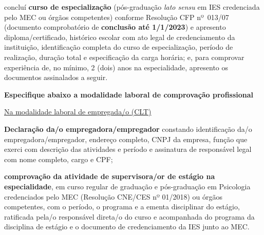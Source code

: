 \documentclass[openright, oneside, a4paper, article, brazil]{abntex2}
\newcommand{\caixasel}[1]{\raisebox{-6pt}{\fbox{\CheckBox[name=#1,bordercolor=black]{\null}}}}
\renewcommand{\subsection}{\centering\bfseries}
\begin{document}
    \begin{minipage}[t]{0.05\textwidth}
        \caixasel{esp3}
    \end{minipage}%
    \begin{minipage}[t]{0.95\textwidth}
	concluí \textbf{curso de especialização} (pós-graduação \textit{lato sensu} em IES credenciada pelo MEC ou órgãos competentes) conforme Resolução CFP nº~013/07 (documento comprobatório de \textbf{conclusão até 1/1/2023}) e apresento diploma/certificado, histórico escolar com ato legal de credenciamento da instituição, identificação completa do curso de especialização, período de realização, duração total e especificação da carga horária; e, para comprovar experiência de, no mínimo, 2 (dois) anos na especialidade, apresento os documentos assinalados a seguir.
\end{minipage}

\clearpage
\subsection{Especifique abaixo a modalidade laboral de comprovação profissional}
\vspace{\baselineskip}
\normalfont

\begin{minipage}{\textwidth}
    \centering
\underline{Na modalidade laboral de empregada/o (CLT)}
\end{minipage}
\vspace{0.5\baselineskip}

\normalfont
\begin{minipage}[t]{0.05\textwidth}
    \caixasel{clt1}
\end{minipage}%
\begin{minipage}[t]{0.95\textwidth}
	\textbf{Declaração da/o empregadora/empregador} constando identificação da/o empregadora/empregador, endereço completo, CNPJ da empresa, função que exerci com descrição das atividades e período e assinatura de responsável legal com nome completo, cargo e CPF;
\end{minipage}
    \vspace*{0.5\baselineskip}

\begin{minipage}[t]{0.05\textwidth}
    \caixasel{clt2}
\end{minipage}%
\begin{minipage}[t]{0.95\textwidth}
	\textbf{comprovação da atividade de supervisora/or de estágio na especialidade}, em curso regular de graduação e pós-graduação em Psicologia credenciados pelo MEC (Resolução CNE/CES nº 01/2018) ou órgãos competentes, com o período, o programa e a ementa disciplinar do estágio, ratificada pela/o responsável direta/o do curso e acompanhada do programa da disciplina de estágio e o documento de credenciamento da IES junto ao MEC.
\end{minipage}
    \vspace*{\baselineskip}
\end{document}

